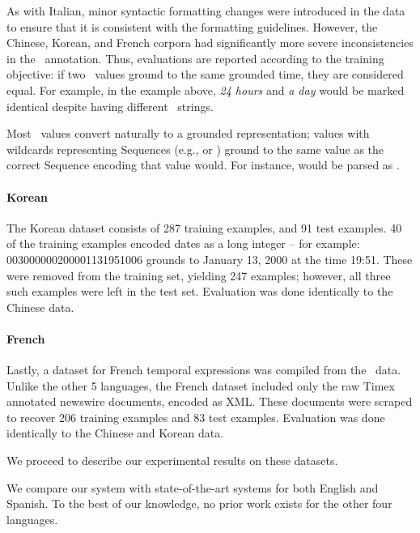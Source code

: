 As with Italian, minor syntactic formatting changes were introduced in the data
  to ensure that it is consistent with the formatting guidelines.
However, the Chinese, Korean, and French corpora had significantly more severe
  inconsistencies in the \timex\ annotation.
Thus, evaluations are reported according to the training objective: if two
  \timex\ values ground to the same grounded time, they are considered equal.
For example, in the example above, \textit{24 hours} and \textit{a day}
  would be marked identical despite having different \timex\ strings.

Most \timex\ values convert naturally to a grounded representation; values
  with wildcards representing Sequences (e.g.,  or )
  ground to the same value as the correct Sequence encoding that value would.
For instance,  would be parsed as .

\paragraph{Korean}
The Korean dataset consists of 287 training examples, and 91 test examples.
40 of the training examples encoded dates as a long integer -- for
  example: 003000000200001131951006 grounds to January 13, 2000 at the time
  19:51.
These were removed from the training set, yielding 247 examples; however,
  all three such examples were left in the test set.
Evaluation was done identically to the Chinese data.

\paragraph{French}
Lastly, a dataset for French temporal expressions was compiled from the
  \tempeval\ data.
Unlike the other 5 languages, the French dataset included only the raw 
  Timex annotated newswire documents, encoded as XML.
These documents were scraped to recover 206 training examples and 83 test
  examples.
Evaluation was done identically to the Chinese and Korean data.

We proceed to describe our experimental results on these datasets.

We compare our system with state-of-the-art systems for both English and
  Spanish.
To the best of our knowledge, no prior work exists for the other four languages.

